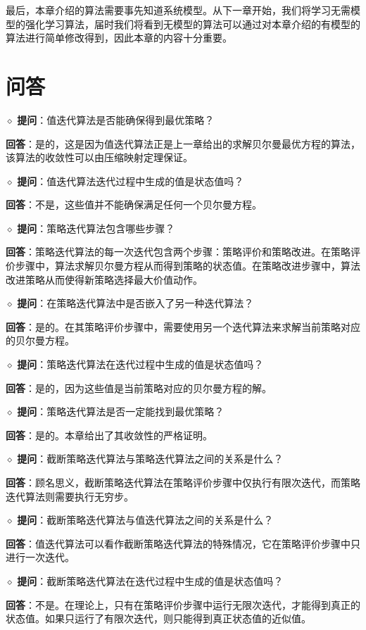 最后，本章介绍的算法需要事先知道系统模型。从下一章开始，我们将学习无需模型的强化学习算法，届时我们将看到无模型的算法可以通过对本章介绍的有模型的算法进行简单修改得到，因此本章的内容十分重要。

\section{问答}
\label{sec:rl-vpi-qa}

$\diamond$ \textbf{提问}：值迭代算法是否能确保得到最优策略？

\textbf{回答}：是的，这是因为值迭代算法正是上一章给出的求解贝尔曼最优方程的算法，该算法的收敛性可以由压缩映射定理保证。

$\diamond$ \textbf{提问}：值迭代算法迭代过程中生成的值是状态值吗？

\textbf{回答}：不是，这些值并不能确保满足任何一个贝尔曼方程。

$\diamond$ \textbf{提问}：策略迭代算法包含哪些步骤？

\textbf{回答}：策略迭代算法的每一次迭代包含两个步骤：策略评价和策略改进。在策略评价步骤中，算法求解贝尔曼方程从而得到策略的状态值。在策略改进步骤中，算法改进策略从而使得新策略选择最大价值动作。

$\diamond$ \textbf{提问}：在策略迭代算法中是否嵌入了另一种迭代算法？

\textbf{回答}：是的。在其策略评价步骤中，需要使用另一个迭代算法来求解当前策略对应的贝尔曼方程。

$\diamond$ \textbf{提问}：策略迭代算法在迭代过程中生成的值是状态值吗？

\textbf{回答}：是的，因为这些值是当前策略对应的贝尔曼方程的解。

$\diamond$ \textbf{提问}：策略迭代算法是否一定能找到最优策略？

\textbf{回答}：是的。本章给出了其收敛性的严格证明。

$\diamond$ \textbf{提问}：截断策略迭代算法与策略迭代算法之间的关系是什么？

\textbf{回答}：顾名思义，截断策略迭代算法在策略评价步骤中仅执行有限次迭代，而策略迭代算法则需要执行无穷步。

$\diamond$ \textbf{提问}：截断策略迭代算法与值迭代算法之间的关系是什么？

\textbf{回答}：值迭代算法可以看作截断策略迭代算法的特殊情况，它在策略评价步骤中只进行一次迭代。

$\diamond$ \textbf{提问}：截断策略迭代算法在迭代过程中生成的值是状态值吗？

\textbf{回答}：不是。在理论上，只有在策略评价步骤中运行无限次迭代，才能得到真正的状态值。如果只运行了有限次迭代，则只能得到真正状态值的近似值。

